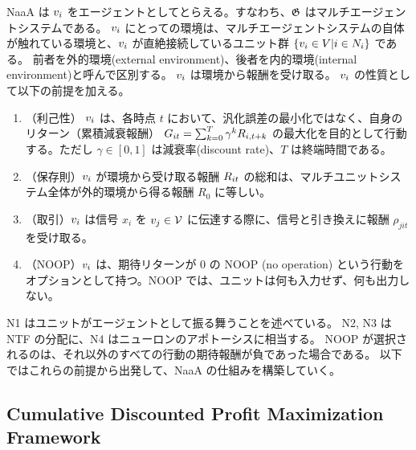NaaA は $v_{i}$ をエージェントとしてとらえる。すなわち、$\mathfrak{G}$ はマルチエージェントシステムである。
$v_{i}$ にとっての環境は、マルチエージェントシステムの自体が触れている環境と、$v_{i}$ が直絶接続しているユニット群 $\{v_i \in V | i \in N_i\}$ である。
前者を外的環境(external environment)、後者を内的環境(internal environment)と呼んで区別する。
$v_{i}$ は環境から報酬を受け取る。
$v_{i}$ の性質として以下の前提を加える。
\begin{enumerate}
\renewcommand{\labelenumi}{N\arabic{enumi}:}
\item （利己性）
	$v_{i}$ は、各時点 $t$ において、汎化誤差の最小化ではなく、自身のリターン（累積減衰報酬）
	$G_{it} = \sum_{k=0}^T \gamma^k R_{i,t+k} $ の最大化を目的として行動する。ただし $\gamma \in [0, 1]$ は減衰率(discount rate)、$T$ は終端時間である。
\item （保存則）$v_{i}$ が環境から受け取る報酬 $R_{it}$ の総和は、マルチユニットシステム全体が外的環境から得る報酬 $R_0$ に等しい。
\item （取引）$v_{i}$ は信号 $x_i$ を $v_{j} \in \mathcal{V}$ に伝達する際に、信号と引き換えに報酬 $\rho_{jit}$ を受け取る。
\item （NOOP）$v_{i}$ は、期待リターンが 0 の NOOP (no operation) という行動をオプションとして持つ。NOOP では、ユニットは何も入力せず、何も出力しない。
\end{enumerate}
N1 はユニットがエージェントとして振る舞うことを述べている。
N2, N3 は NTF の分配に、N4 はニューロンのアポトーシスに相当する。
NOOP が選択されるのは、それ以外のすべての行動の期待報酬が負であった場合である。
以下ではこれらの前提から出発して、NaaA の仕組みを構築していく。

\subsection{Cumulative Discounted Profit Maximization Framework}
%

